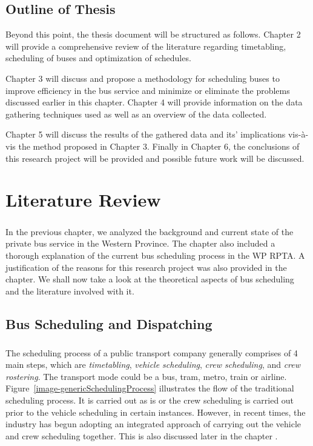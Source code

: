 \documentclass[12pt, oneside]{report}
\begin{document}
\newpage

\section{Outline of Thesis}
\label{section-OutlineOfThesis}

Beyond this point, the thesis document will be structured as follows. Chapter 2 will provide a comprehensive review of the literature regarding timetabling, scheduling of buses and optimization of schedules. 

Chapter 3 will discuss and propose a methodology for scheduling buses to improve efficiency in the bus service and minimize or eliminate the problems discussed earlier in this chapter. Chapter 4 will provide information on the data gathering techniques used as well as an overview of the data collected.

Chapter 5 will discuss the results of the gathered data and its’ implications vis-\`{a}-vis the method proposed in Chapter 3. Finally in Chapter 6, the conclusions of this research project will be provided and possible future work will be discussed.

\newpage

\chapter {Literature Review}
\label{chapter-LitReview}

\paragraph{ } In the previous chapter, we analyzed the background and current state of the private bus service in the Western Province. The chapter also included a thorough explanation of the current bus scheduling process in the WP RPTA. A justification of the reasons for this research project was also provided in the chapter.  We shall now take a look at the theoretical aspects of bus scheduling and the literature involved with it.

\section*{Bus Scheduling and Dispatching}

\paragraph{ } The scheduling process of a public transport company generally comprises of 4 main steps, which are \textit{timetabling}, \textit{vehicle scheduling}, \textit{crew scheduling}, and \textit{crew rostering}. The transport mode could be a bus, tram, metro, train or airline. Figure~\ref{image-genericSchedulingProcess} illustrates the flow of the traditional scheduling process. It is carried out as is or the crew scheduling is carried out prior to the vehicle scheduling in certain instances. However, in recent times, the industry has begun adopting an integrated approach of carrying out the vehicle and crew scheduling together. This is also discussed later in the chapter \citep{Huisman2004}.
\end{document}
